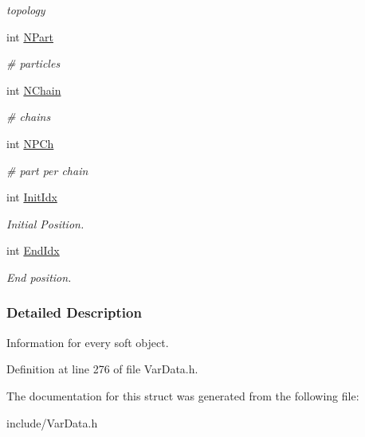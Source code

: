 \begin{DoxyCompactItemize}
\begin{DoxyCompactList}\small\item\em topology \end{DoxyCompactList}\item 
\hypertarget{structSOFT_abdcc792391d8c5092471dff191de47f4}{int \hyperlink{structSOFT_abdcc792391d8c5092471dff191de47f4}{\-N\-Part}}\label{structSOFT_abdcc792391d8c5092471dff191de47f4}

\begin{DoxyCompactList}\small\item\em \# particles \end{DoxyCompactList}\item 
\hypertarget{structSOFT_aa49e4d7af0d71e79524ef6fb081707b5}{int \hyperlink{structSOFT_aa49e4d7af0d71e79524ef6fb081707b5}{\-N\-Chain}}\label{structSOFT_aa49e4d7af0d71e79524ef6fb081707b5}

\begin{DoxyCompactList}\small\item\em \# chains \end{DoxyCompactList}\item 
\hypertarget{structSOFT_a521663d12899e0fefe0a182332a8573f}{int \hyperlink{structSOFT_a521663d12899e0fefe0a182332a8573f}{\-N\-P\-Ch}}\label{structSOFT_a521663d12899e0fefe0a182332a8573f}

\begin{DoxyCompactList}\small\item\em \# part per chain \end{DoxyCompactList}\item 
\hypertarget{structSOFT_a71d10413e52e4e5aa82ac5e6189afdd0}{int \hyperlink{structSOFT_a71d10413e52e4e5aa82ac5e6189afdd0}{\-Init\-Idx}}\label{structSOFT_a71d10413e52e4e5aa82ac5e6189afdd0}

\begin{DoxyCompactList}\small\item\em \-Initial \-Position. \end{DoxyCompactList}\item 
\hypertarget{structSOFT_a3fa6306dcea956ea84ce7b5f2b22f628}{int \hyperlink{structSOFT_a3fa6306dcea956ea84ce7b5f2b22f628}{\-End\-Idx}}\label{structSOFT_a3fa6306dcea956ea84ce7b5f2b22f628}

\begin{DoxyCompactList}\small\item\em \-End position. \end{DoxyCompactList}\end{DoxyCompactItemize}


\subsubsection{\-Detailed \-Description}
\-Information for every soft object. 

\-Definition at line 276 of file \-Var\-Data.\-h.



\-The documentation for this struct was generated from the following file\-:\begin{DoxyCompactItemize}
\item 
include/\-Var\-Data.\-h\end{DoxyCompactItemize}
